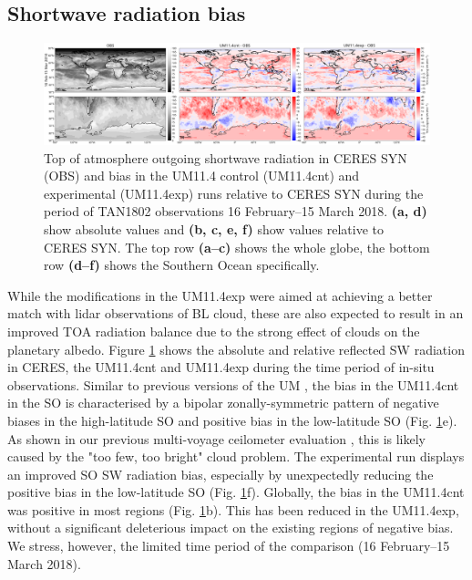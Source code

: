 
\subsection{Shortwave radiation bias}
\label{sec:4:sw-bias}

\begin{figure}[t]
\centering
\includegraphics[width=\textwidth]{chapter4/fig/sw.png}
\caption[Top of atmosphere outgoing shortwave radiation]{Top of atmosphere outgoing shortwave radiation in CERES SYN (OBS) and
bias in the UM11.4 control (UM11.4cnt) and experimental (UM11.4exp) runs relative
to CERES SYN during the period of TAN1802 observations 16 February--15 March 2018.
\textbf{(a, d)} show absolute values and \textbf{(b, c, e, f)} show values relative
to CERES SYN. The top row \textbf{(a--c)} shows the whole globe, the bottom
row \textbf{(d--f)} shows the Southern Ocean specifically.
}
\label{fig:4:sw}
\end{figure}

While the modifications in the UM11.4exp were aimed at achieving a better
match with lidar observations of BL cloud, these are also expected to
result in an improved TOA radiation balance due to the strong effect of
clouds on the planetary albedo. Figure \ref{fig:4:sw} shows the absolute
and relative reflected SW radiation in CERES, the UM11.4cnt and UM11.4exp
during the time period of in-situ observations. Similar to previous
versions of the UM \citep{kuma2020a,schuddeboom2019}, the bias in the UM11.4cnt
in the SO is characterised by a bipolar zonally-symmetric pattern of negative
biases in the high-latitude SO
and positive bias in the low-latitude SO (Fig. \ref{fig:4:sw}e).
As shown in our previous multi-voyage ceilometer
evaluation \citep{kuma2020a}, this is likely caused by the "too few, too bright"
cloud problem. The experimental run displays an improved SO SW radiation
bias, especially by unexpectedly reducing the positive bias in the low-latitude SO
(Fig. \ref{fig:4:sw}f). Globally, the bias in the UM11.4cnt was positive in most
regions (Fig. \ref{fig:4:sw}b). This has been reduced in the UM11.4exp, without
a significant deleterious impact on the existing regions of negative bias. We stress,
however, the limited time period of the comparison (16 February--15 March 2018).

